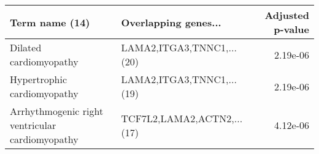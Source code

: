 \begin{tabular}{llr}
\toprule
                                 Term name (14) &       Overlapping genes... &  Adjusted p-value \\
\midrule
                         Dilated cardiomyopathy &  LAMA2,ITGA3,TNNC1,...(20) &          2.19e-06 \\
                    Hypertrophic cardiomyopathy &  LAMA2,ITGA3,TNNC1,...(19) &          2.19e-06 \\
Arrhythmogenic right ventricular cardiomyopathy & TCF7L2,LAMA2,ACTN2,...(17) &          4.12e-06 \\
\bottomrule
\end{tabular}
